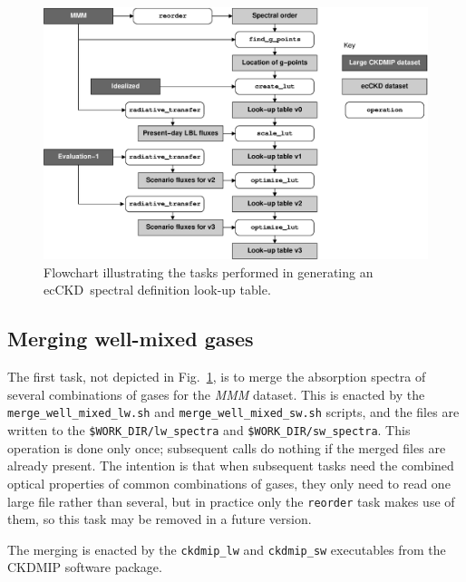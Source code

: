 \documentclass[a4,oneside]{article}
\def\codesize{\small}
\newcommand{\ecckd}{ecCKD}
\def\codesize{\small}
\def\code#1{{\codesize\texttt{#1}}}
\begin{document}
\begin{figure}[tb!]
\includegraphics[width=\columnwidth]{flowchart.eps}
\caption{\label{fig:flowchart}Flowchart illustrating the tasks
  performed in generating an \ecckd\ spectral definition look-up
  table.}
\end{figure}

\subsection{Merging well-mixed gases}
\label{sec:merge}
The first task, not depicted in Fig.\ \ref{fig:flowchart}, is to merge
the absorption spectra of several combinations of gases for the
\emph{MMM} dataset. This is enacted by the
\code{merge\_well\_mixed\_lw.sh} and \code{merge\_well\_mixed\_sw.sh}
scripts, and the files are written to the
\code{\$WORK\_DIR/lw\_spectra} and
\code{\$WORK\_DIR/sw\_spectra}. This operation is done only once;
subsequent calls do nothing if the merged files are already
present. The intention is that when subsequent tasks need the combined
optical properties of common combinations of gases, they only need to
read one large file rather than several, but in practice only the
\code{reorder} task makes use of them, so this task may be removed in
a future version.

The merging is enacted by the \code{ckdmip\_lw} and \code{ckdmip\_sw}
executables from the CKDMIP software package.
\end{document}
